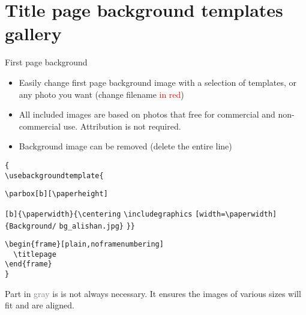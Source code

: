 \documentclass[10pt,t]{beamer}
\begin{document}
\section{Title page background templates gallery}
\begin{frame}[fragile]{First page background}\label{background_image}
    \begin{itemize}
        \item Easily change first page background image with a selection of templates, or any photo you want (change filename \textcolor{red}{in red})
        \item All included images are based on photos that free for commercial and non-commercial use. Attribution is not required.
        \item Background image can be removed (delete the entire line)
    \end{itemize}
    
  \vspace{6pt}  
\verb+{+ \\

\verb+\usebackgroundtemplate{+{\color{gray} \verb+\parbox[b][\paperheight]+

    \verb+[b]{\paperwidth}{\centering+
\color{black}\verb+\includegraphics+
\color{gray} \verb+[width=\paperwidth]+\color{black}\verb+{Background/+\color{red} \verb+bg_alishan.jpg+\color{black}\verb+}+\color{gray} \verb+}+\color{black}\verb+}+ 
}

\smallskip
\verb+\begin{frame}[plain,noframenumbering]+ \\
\verb+  \titlepage+ \\
\verb+\end{frame}+ \\
\verb+}+

\vspace{12pt}  
\footnotesize{Part in \textcolor{gray}{gray} is is not always necessary. It ensures the images of various sizes will fit and are aligned.}
\end{frame}






{
\begin{frame}
    \titlepage
\end{frame}
}

{
\begin{frame}
    \titlepage
\end{frame}
}

{
\begin{frame}
    \titlepage
\end{frame}
}
\end{document}
